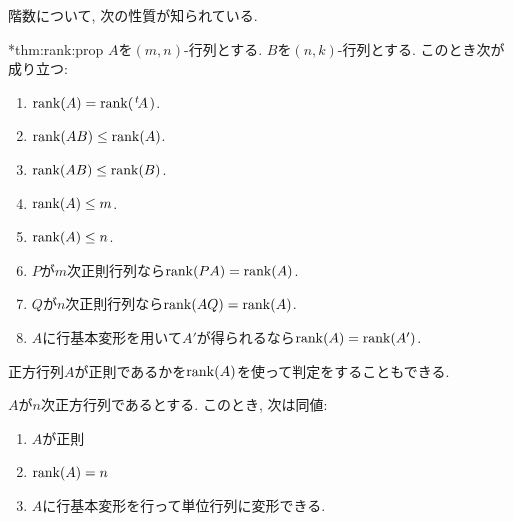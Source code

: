 階数について, 次の性質が知られている.
\begin{theorem}
  \provelater**{thm:rank:prop}
  \label{thm:rank:prop}
  $A$を$(m,n)$-行列とする.
  $B$を$(n,k)$-行列とする.
  このとき次が成り立つ:
  \begin{enumerate}
  \item
    \label{thm:rank:prop:trans}
    $\operatorname{rank}(A)=\operatorname{rank}({\left.^{t}\!A\right.})$.
  \item
    \label{thm:rank:prop:left}
    $\operatorname{rank}(AB)\leq\operatorname{rank}(A)$.
  \item
    \label{thm:rank:prop:right}
    $\operatorname{rank}(AB)\leq\operatorname{rank}(B)$.
  \item
    \label{thm:rank:prop:row}
    $\operatorname{rank}(A)\leq m$.
  \item
    \label{thm:rank:prop:col}
    $\operatorname{rank}(A)\leq n$.
  \item
    $P$が$m$次正則行列なら$\operatorname{rank}(PA)=\operatorname{rank}(A)$.
  \item
    \label{thm:rank:prop:regularright}
    $Q$が$n$次正則行列なら$\operatorname{rank}(AQ)=\operatorname{rank}(A)$.
  \item
    \label{thm:rank:prop:fund}
    $A$に行基本変形を用いて$A'$が得られるなら$\operatorname{rank}(A)=\operatorname{rank}(A')$.
  \end{enumerate}
\end{theorem}

正方行列$A$が正則であるかを$\operatorname{rank}(A)$を使って判定をすることもできる.
\begin{theorem}
  \label{thm:rank:regular}
  $A$が$n$次正方行列であるとする.
  このとき, 次は同値:
  \begin{enumerate}
  \item\label{thm:rank:regular:reg}
    $A$が正則
  \item\label{thm:rank:regular:rank}
    $\operatorname{rank}(A)=n$
  \item\label{thm:rank:regular:step}
    $A$に行基本変形を行って単位行列に変形できる.
  \end{enumerate}
\end{theorem}

